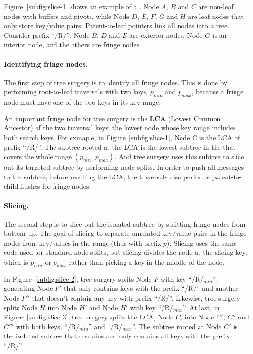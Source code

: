 Figure~\ref{subfig:slice-1} shows an example of a \bet.
Node $A$, $B$ and $C$ are non-leaf nodes with buffers and pivots, while
Node $D$, $E$, $F$, $G$ and $H$ are leaf nodes that only store key/value pairs.
Parent-to-leaf pointers link all nodes into a tree.
Consider prefix ``/R/'',
Node $B$, $D$ and $E$ are exterior nodes, Node $G$ is an interior node,
and the others are fringe nodes.

\paragraph{Identifying fringe nodes.}
The first step of tree surgery is to identify all fringe nodes.
This is done by performing root-to-leaf traversals with two keys,
$p_{min}$ and $p_{max}$,
because a fringe node must have one of the two keys in its key range.

An important fringe node for tree surgery is the \textbf{LCA}
(Lowest Common Ancestor) of the two traversal keys: the lowest \bet node
whose key range includes both search keys.
For exmaple, in Figure~\ref{subfig:slice-1}, Node C is the LCA of prefix ``/R/''.
The subtree rooted at the LCA is the lowest subtree in the \bet that covers
the whole range $(p_{min}, p_{max})$.
And tree surgery uses this subtree to slice out its targeted subtree
by performing node splits.
In order to push all messages to the subtree, before reaching the LCA,
the traversals also performs parent-to-child flushes for fringe nodes.

\paragraph{Slicing.}
The second step is to slice out the isolated subtree by splitting fringe nodes
from bottom up.
The goal of slicing to separate unrelated key/value pairs in the fringe nodes
from key/values in the range (thus with prefix $p$).
Slicing uses the same code used for standard \bet node splits, but slicing
divides the node at the slicing key, which is $p_{min}$ or $p_{max}$ rather than
picking a key in the middle of the node.

In Figure~\ref{subfig:slice-2}, tree surgery splits Node $F$ with key
``/R/$_{min}$'', generating Node $F'$ that only contains keys with the prefix
``/R/'' and another Node $F''$ that doesn't contain any key with prefix
``/R/''.
Likewise, tree surgery splits Node $H$ into Node $H'$ and Node $H'$ with key
``/R/$_{max}$''.
At last, in Figure~\ref{subfig:slice-3}, tree surgery splits the LCA, Node $C$,
into Node $C'$, $C''$ and $C'''$ with both keys, ``/R/$_{min}$'' and
``/R/$_{max}$''.
The subtree rooted at Node $C'$ is the isolated subtree that contains and
only contains all keys with the prefix ``/R/''.

